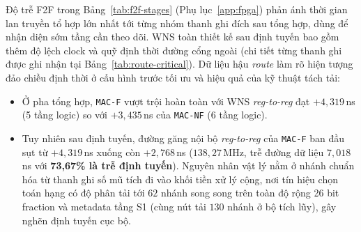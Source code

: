 Độ trễ F2F trong Bảng~\ref{tab:f2f-stages} (Phụ lục~\ref{app:fpga}) phản ánh
thời gian lan truyền tổ hợp lớn nhất tới từng nhóm thanh ghi đích sau tổng hợp,
dùng để nhận diện sớm tầng cần theo dõi. WNS toàn thiết kế sau định tuyến bao
gồm thêm độ lệch clock và quỹ định thời đường cổng ngoài (chi tiết từng thanh ghi
được ghi nhận tại Bảng~\ref{tab:route-critical}). Dữ liệu hậu \textit{route}
làm rõ hiện tượng đảo chiều định thời ở cấu hình trước tối ưu và hiệu quả của kỹ
thuật tách tải:
\begin{itemize}
  \item Ở pha tổng hợp, \texttt{MAC-F} vượt trội hoàn toàn với WNS \textit{reg-to-reg}
        đạt $+4{,}319$\,ns (5 tầng logic) so với $+3{,}435$\,ns của \texttt{MAC-NF}
        (6 tầng logic).
  \item Tuy nhiên sau định tuyến, đường găng nội bộ \textit{reg-to-reg} của
        \texttt{MAC-F} ban đầu sụt từ $+4{,}319$\,ns xuống còn $+2{,}768$\,ns
        ($138{,}27$\,MHz, trễ đường dữ liệu $7{,}018$\,ns với \textbf{73,67\% là
        trễ định tuyến}). Nguyên nhân vật lý nằm ở nhánh chuẩn hóa từ thanh ghi
        số mũ tích đi vào khối tiền xử lý cộng, nơi tín hiệu chọn toán hạng có
        độ phân tải tới $62$ nhánh song song trên toàn độ rộng 26 bit fraction và
        metadata tầng S1 (cùng nút tải $130$ nhánh ở bộ tích lũy), gây nghẽn
        định tuyến cục bộ.
\end{itemize}

